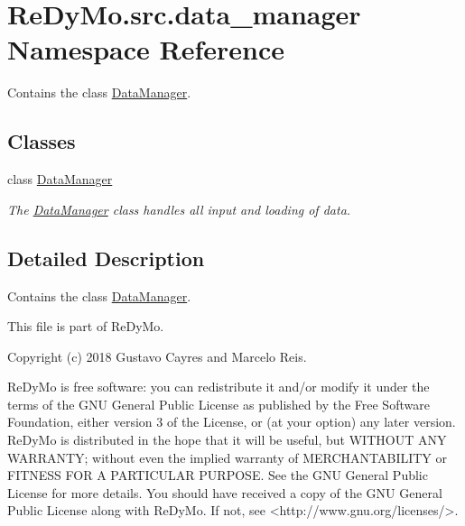 \hypertarget{namespaceReDyMo_1_1src_1_1data__manager}{}\section{Re\+Dy\+Mo.\+src.\+data\+\_\+manager Namespace Reference}
\label{namespaceReDyMo_1_1src_1_1data__manager}


Contains the class \mbox{\hyperlink{classReDyMo_1_1src_1_1data__manager_1_1DataManager}{Data\+Manager}}.  


\subsection*{Classes}
\begin{DoxyCompactItemize}
\item 
class \mbox{\hyperlink{classReDyMo_1_1src_1_1data__manager_1_1DataManager}{Data\+Manager}}
\begin{DoxyCompactList}\small\item\em The \mbox{\hyperlink{classReDyMo_1_1src_1_1data__manager_1_1DataManager}{Data\+Manager}} class handles all input and loading of data. \end{DoxyCompactList}\end{DoxyCompactItemize}


\subsection{Detailed Description}
Contains the class \mbox{\hyperlink{classReDyMo_1_1src_1_1data__manager_1_1DataManager}{Data\+Manager}}. 

\begin{DoxyVerb}This file is part of ReDyMo.

    Copyright (c) 2018  Gustavo Cayres and Marcelo Reis.

    ReDyMo is free software: you can redistribute it and/or modify it
    under the terms of the GNU General Public License as published by the
    Free Software Foundation, either version 3 of the License, or (at your
    option) any later version.
    ReDyMo is distributed in the hope that it will be useful, but WITHOUT
    ANY WARRANTY; without even the implied warranty of MERCHANTABILITY or
    FITNESS FOR A PARTICULAR PURPOSE. See the GNU General Public License
    for more details.
    You should have received a copy of the GNU General Public License along
    with ReDyMo. If not, see <http://www.gnu.org/licenses/>.\end{DoxyVerb}
